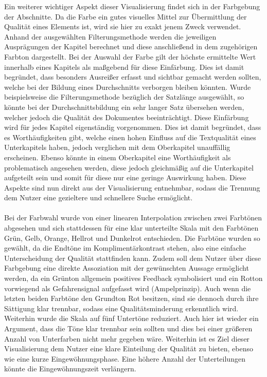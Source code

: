 Ein weiterer wichtiger Aspekt dieser Visualisierung findet sich in der Farbgebung der Abschnitte. Da die Farbe ein gutes visuelles Mittel zur \"Ubermittlung der Qualit\"at eines Elements ist, wird sie hier zu exakt jenem Zweck verwendet. Anhand der ausgew\"ahlten Filterungsmethode werden die jeweiligen Auspr\"agungen der Kapitel berechnet und diese anschlie{\ss}end in dem zugeh\"origen Farbton dargestellt. Bei der Auswahl der Farbe gilt der h\"ochste ermittelte Wert innerhalb eines Kapitels als ma{\ss}gebend f\"ur diese Einf\"arbung. Dies ist damit begr\"undet, dass besonders Ausrei{\ss}er erfasst und sichtbar gemacht werden sollten, welche bei der Bildung eines Durchschnitts verborgen bleiben k\"onnten. Wurde beispielsweise die Filterungsmethode bez\"uglich der Satzl\"ange ausgew\"ahlt, so k\"onnte bei der Durchschnittsbildung ein sehr langer Satz \"ubersehen werden, welcher jedoch die Qualit\"at des Dokumentes beeintr\"achtigt. Diese Einf\"arbung wird f\"ur jedes Kapitel eigenst\"andig vorgenommen. Dies ist damit begr\"undet, dass es Worth\"aufigkeiten gibt, welche einen hohen Einfluss auf die Textqualit\"at eines Unterkapitels haben, jedoch verglichen mit dem Oberkapitel unauff\"allig erscheinen. Ebenso k\"onnte in einem Oberkapitel eine Worth\"aufigkeit als problematisch angesehen werden, diese jedoch gleichm\"a{\ss}ig auf die Unterkapitel aufgeteilt sein und somit f\"ur diese nur eine geringe Auswirkung haben. Diese Aspekte sind nun direkt aus der Visualisierung entnehmbar, sodass die Trennung dem Nutzer eine gezieltere und schnellere Suche erm\"oglicht.\\
\\
Bei der Farbwahl wurde von einer linearen Interpolation zwischen zwei Farbt\"onen abgesehen und sich stattdessen f\"ur eine klar unterteilte Skala mit den Farbt\"onen Gr\"un, Gelb, Orange, Hellrot und Dunkelrot entschieden. Die Farbt\"one wurden so gew\"ahlt, da die Endt\"one im Kompliment\"arkontrast stehen, also eine einfache Unterscheidung der Qualit\"at stattfinden kann. Zudem soll dem Nutzer \"uber diese Farbgebung eine direkte Assoziation mit der gew\"unschten Aussage erm\"oglicht werden, da ein Gr\"unton allgemein positives Feedback symbolisiert und ein Rotton vorwiegend als Gefahrensignal aufgefasst wird (Ampelprinzip). Auch wenn die letzten beiden Farbt\"one den Grundton Rot besitzen, sind sie dennoch durch ihre S\"attigung klar trennbar, sodass eine Qualit\"atsminderung erkenntlich wird. Weiterhin wurde die Skala auf f\"unf Untert\"one reduziert. Auch hier ist wieder ein Argument, dass die T\"one klar trennbar sein sollten und dies bei einer gr\"o{\ss}eren Anzahl von Unterfarben nicht mehr gegeben w\"are. Weiterhin ist es Ziel dieser Visualisierung dem Nutzer eine klare Einteilung der Qualit\"at zu bieten, ebenso wie eine kurze Eingew\"ohnungsphase. Eine h\"ohere Anzahl der Unterteilungen k\"onnte die Eingew\"ohnungszeit verl\"angern.\\
